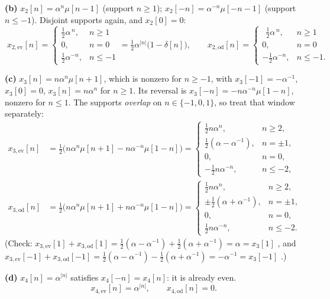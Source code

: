 \textbf{(b)} $x_2[n]=\alpha^{n}\mu[n-1]$ (support $n\ge1$); $x_2[-n]=\alpha^{-n}\mu[-n-1]$
(support $n\le-1$). Disjoint supports again, and $x_2[0]=0$:
\[
\boxed{\;
x_{2,\mathrm{ev}}[n]=\begin{cases}\tfrac12\alpha^{\,n},& n\ge1\\ 0,& n=0\\ \tfrac12\alpha^{-n},& n\le-1\end{cases}
=\tfrac12\alpha^{|n|}\bigl(1-\delta[n]\bigr),
\qquad
x_{2,\mathrm{od}}[n]=\begin{cases}\ \ \tfrac12\alpha^{\,n},& n\ge1\\ 0,& n=0\\ -\tfrac12\alpha^{-n},& n\le-1 .\end{cases}\;}
\]

\textbf{(c)} $x_3[n]=n\alpha^{n}\mu[n+1]$, which is nonzero for $n\ge -1$, with
$x_3[-1]=-\alpha^{-1}$, $x_3[0]=0$, $x_3[n]=n\alpha^n$ for $n\ge1$.
Its reversal is $x_3[-n]=-n\alpha^{-n}\mu[1-n]$, nonzero for $n\le 1$. The supports
\emph{overlap} on $n\in\{-1,0,1\}$, so treat that window separately:
\[
\boxed{
\begin{aligned}
x_{3,\mathrm{ev}}[n]&=\tfrac12\bigl(n\alpha^{n}\mu[n+1]-n\alpha^{-n}\mu[1-n]\bigr)
=\begin{cases}
\tfrac12 n\alpha^{n}, & n\ge 2,\\[2pt]
\tfrac12(\alpha-\alpha^{-1}), & n=\pm 1,\\[2pt]
0, & n=0,\\[2pt]
-\tfrac12 n\alpha^{-n}, & n\le -2,
\end{cases}\\[6pt]
x_{3,\mathrm{od}}[n]&=\tfrac12\bigl(n\alpha^{n}\mu[n+1]+n\alpha^{-n}\mu[1-n]\bigr)
=\begin{cases}
\tfrac12 n\alpha^{n}, & n\ge 2,\\[2pt]
\pm\tfrac12(\alpha+\alpha^{-1}), & n=\pm1,\\[2pt]
0, & n=0,\\[2pt]
\tfrac12 n\alpha^{-n}, & n\le -2 .
\end{cases}
\end{aligned}}
\]
(Check: $x_{3,\mathrm{ev}}[1]+x_{3,\mathrm{od}}[1]=\tfrac12(\alpha-\alpha^{-1})+\tfrac12(\alpha+\alpha^{-1})=\alpha=x_3[1]$ \checkmark, and
$x_{3,\mathrm{ev}}[-1]+x_{3,\mathrm{od}}[-1]=\tfrac12(\alpha-\alpha^{-1})-\tfrac12(\alpha+\alpha^{-1})=-\alpha^{-1}=x_3[-1]$ \checkmark.)

\textbf{(d)} $x_4[n]=\alpha^{|n|}$ satisfies $x_4[-n]=x_4[n]$: it is already even.
\[
\boxed{\;x_{4,\mathrm{ev}}[n]=\alpha^{|n|},\qquad x_{4,\mathrm{od}}[n]=0 .\;}
\]

